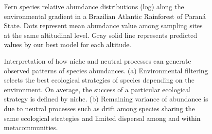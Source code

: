 \documentclass[12pt]{article}
\begin{document}
\begin{figure}[!ht]
 \begin{center}
\end{center}
\caption{Fern species relative abundance distributions (log) along the environmental gradient in a Brazilian Atlantic Rainforest of Paran\'a State. Dots represent mean abundance value among sampling sites at the same altitudinal level. Gray solid line represents predicted values by our best model for each altitude.}\label{sads}
\end{figure}

\begin{figure}[!ht]
 \begin{center}
\end{center}
\caption{Interpretation of how niche and neutral processes can generate observed patterns of species abundances. (a) Environmental filtering selects the best ecological strategies of species depending on the environment. On average, the success of a particular ecological strategy is defined by niche. (b) Remaining variance of abundance is due to neutral processes such as drift among species sharing the same ecological strategies and limited dispersal among and within metacommunities.} \label{final}
\end{figure}

\newpage
\end{document}
